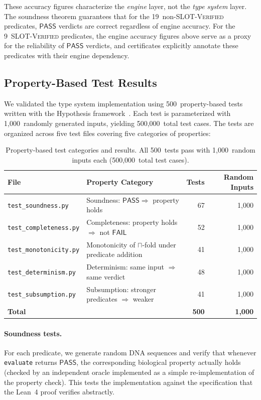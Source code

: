\documentclass[acmsmall,review,anonymous]{acmart}
\newcommand{\PASS}{\ensuremath{\mathsf{PASS}}\xspace}
\newcommand{\FAIL}{\ensuremath{\mathsf{FAIL}}\xspace}
\begin{document}
These accuracy figures characterize the \emph{engine} layer, not the
\emph{type system} layer.  The soundness theorem guarantees that for the
19~non-SLOT-\textsc{Verified} predicates, \PASS{} verdicts are correct
regardless of engine accuracy.  For the 9~SLOT-\textsc{Verified}
predicates, the engine accuracy figures above serve as a proxy for the
reliability of \PASS{} verdicts, and certificates explicitly annotate
these predicates with their engine dependency.

\subsection{Property-Based Test Results}\label{sec:pbt-eval}

We validated the type system implementation using 500~property-based
tests written with the Hypothesis framework~\cite{maciver2019hypothesis}.
Each test is parameterized with 1,000~randomly generated inputs, yielding
500,000~total test cases.  The tests are organized across five test
files covering five categories of properties:

\begin{table}[t]
\centering
\caption{Property-based test categories and results.  All 500~tests
         pass with 1,000~random inputs each (500,000~total test cases).}
\label{tab:pbt-eval}
\begin{tabular}{llrr}
\toprule
\textbf{File} & \textbf{Property Category} & \textbf{Tests} &
  \textbf{Random Inputs} \\
\midrule
\texttt{test\_soundness.py}   & Soundness: $\PASS \Rightarrow$ property holds  & 67  & 1,000 \\
\texttt{test\_completeness.py}& Completeness: property holds $\Rightarrow$ not \FAIL & 52  & 1,000 \\
\texttt{test\_monotonicity.py}& Monotonicity of $\sqcap$-fold under predicate addition & 41  & 1,000 \\
\texttt{test\_determinism.py} & Determinism: same input $\Rightarrow$ same verdict & 48  & 1,000 \\
\texttt{test\_subsumption.py} & Subsumption: stronger predicates $\Rightarrow$ weaker & 41  & 1,000 \\
\midrule
\textbf{Total}                & & \textbf{500} & \textbf{1,000} \\
\bottomrule
\end{tabular}
\end{table}

\paragraph{Soundness tests.}
For each predicate, we generate random DNA sequences and verify that
whenever \texttt{evaluate} returns \PASS, the corresponding biological
property actually holds (checked by an independent oracle implemented
as a simple re-implementation of the property check).  This tests the
implementation against the specification that the Lean~4 proof verifies
abstractly.
\end{document}
